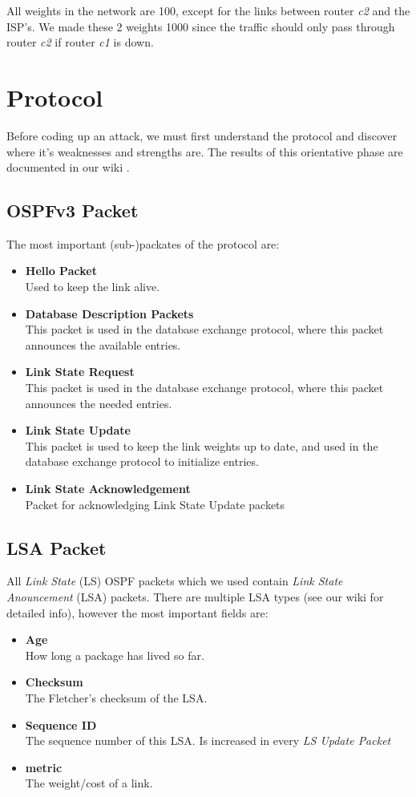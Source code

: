 \documentclass[11pt,a4paper,oneside]{article}
\newcommand{\lsection}[2]{\section{#1}\label{sec:#2}}
\newcommand{\lsubsection}[2]{\subsection{#1}\label{sec:#2}}
\begin{document}
    		All weights in the network are 100, except for the links between router \textit{c2} and the ISP's.
    		We made these 2 weights 1000 since the traffic should only pass through router \textit{c2} if router \textit{c1} is down.


    \lsection{Protocol}{protocol}
    Before coding up an attack, we must first understand the protocol and discover where it's weaknesses and strengths are. The results of this orientative phase are documented in our wiki \cite{wiki}.
    \lsubsection{OSPFv3 Packet}{ospfv3_packet}
    The most important (sub-)packates of the protocol are:
    \begin{itemize}
        \item \textbf{Hello Packet}\\
        Used to keep the link alive.
        \item \textbf{Database Description Packets}\\
        This packet is used in the database exchange protocol, where this packet announces the available entries.
        \item \textbf{Link State Request}\\
        This packet is used in the database exchange protocol, where this packet announces the needed entries.
        \item \textbf{Link State Update}\\
        This packet is used to keep the link weights up to date, and used in the database exchange protocol to initialize entries.
        \item \textbf{Link State Acknowledgement}\\
        Packet for acknowledging Link State Update packets
    \end{itemize}
    \lsubsection{LSA Packet}{lsa_packet}
    All \textit{Link State} (LS) OSPF packets which we used contain \textit{Link State Anouncement} (LSA) packets. There are multiple LSA types (see our wiki\cite{wiki} for detailed info), however the most important fields are:
    \begin{itemize}
        \item \textbf{Age}\\
        How long a package has lived so far.
        \item \textbf{Checksum}\\
        The Fletcher's checksum\cite{fletcher} of the LSA.
        \item \textbf{Sequence ID}\\
        The sequence number of this LSA. Is increased in every \textit{LS Update Packet}
        \item \textbf{metric}\\
        The weight/cost of a link.
    \end{itemize}
\end{document}
